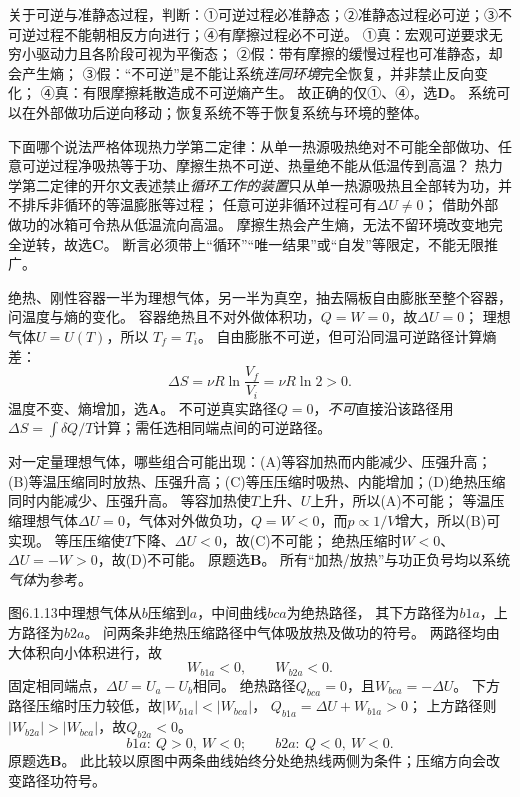 \problemtext 关于可逆与准静态过程，判断：①可逆过程必准静态；②准静态过程必可逆；③不可逆过程不能朝相反方向进行；④有摩擦过程必不可逆。
\workings
①真：宏观可逆要求无穷小驱动力且各阶段可视为平衡态；
②假：带有摩擦的缓慢过程也可准静态，却会产生熵；
③假：“不可逆”是不能让系统\emph{连同环境}完全恢复，并非禁止反向变化；
④真：有限摩擦耗散造成不可逆熵产生。
故正确的仅①、④，选\textbf{D}。
\crosscheck 系统可以在外部做功后逆向移动；恢复系统不等于恢复系统与环境的整体。

\problemtext 下面哪个说法严格体现热力学第二定律：从单一热源吸热绝对不可能全部做功、任意可逆过程净吸热等于功、摩擦生热不可逆、热量绝不能从低温传到高温？
\workings
热力学第二定律的开尔文表述禁止\emph{循环工作的装置}只从单一热源吸热且全部转为功，并不排斥非循环的等温膨胀等过程；
任意可逆非循环过程可有$\Delta U\ne0$；
借助外部做功的冰箱可令热从低温流向高温。
摩擦生热会产生熵，无法不留环境改变地完全逆转，故选\textbf{C}。
\crosscheck 断言必须带上“循环”“唯一结果”或“自发”等限定，不能无限推广。

\problemtext 绝热、刚性容器一半为理想气体，另一半为真空，抽去隔板自由膨胀至整个容器，问温度与熵的变化。
\workings
容器绝热且不对外做体积功，$Q=W=0$，故$\Delta U=0$；
理想气体$U=U(T)$，所以
$\boxed{T_f=T_i}$。
自由膨胀不可逆，但可沿同温可逆路径计算熵差：
\[
\boxed{\Delta S=\nu R\ln\frac{V_f}{V_i}
=\nu R\ln2>0}.
\]
温度不变、熵增加，选\textbf{A}。
\crosscheck 不可逆真实路径$Q=0$，\emph{不可}直接沿该路径用$\Delta S=\int\delta Q/T$计算；需任选相同端点间的可逆路径。

\problemtext 对一定量理想气体，哪些组合可能出现：(A)等容加热而内能减少、压强升高；(B)等温压缩同时放热、压强升高；(C)等压压缩时吸热、内能增加；(D)绝热压缩同时内能减少、压强升高。
\workings
等容加热使$T$上升、$U$上升，所以(A)不可能；
等温压缩理想气体$\Delta U=0$，气体对外做负功，$Q=W<0$，而$p\propto1/V$增大，所以(B)可实现。
等压压缩使$T$下降、$\Delta U<0$，故(C)不可能；
绝热压缩时$W<0$、$\Delta U=-W>0$，故(D)不可能。
原题选\textbf{B}。
\crosscheck 所有“加热/放热”与功正负号均以系统\emph{气体}为参考。

\problemtext 图6.1.13中理想气体从$b$压缩到$a$，中间曲线$bca$为绝热路径，
其下方路径为$b1a$，上方路径为$b2a$。
问两条非绝热压缩路径中气体吸放热及做功的符号。
\workings
两路径均由大体积向小体积进行，故
\[
W_{b1a}<0,\qquad W_{b2a}<0.
\]
固定相同端点，$\Delta U=U_a-U_b$相同。
绝热路径$Q_{bca}=0$，且$W_{bca}=-\Delta U$。
下方路径压缩时压力较低，故$|W_{b1a}|<|W_{bca}|$，
$Q_{b1a}=\Delta U+W_{b1a}>0$；
上方路径则$|W_{b2a}|>|W_{bca}|$，故$Q_{b2a}<0$。
\[
\boxed{b1a:\ Q>0,\ W<0;\qquad b2a:\ Q<0,\ W<0}.
\]
原题选\textbf{B}。
\crosscheck 此比较以原图中两条曲线始终分处绝热线两侧为条件；压缩方向会改变路径功符号。

